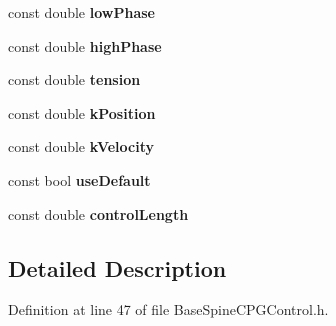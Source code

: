 \begin{DoxyCompactItemize}
\item 
\hypertarget{struct_base_spine_c_p_g_control_1_1_config_a334aedea7ddcc9e4c5156c81802df39f}{const double {\bfseries low\-Phase}}\label{struct_base_spine_c_p_g_control_1_1_config_a334aedea7ddcc9e4c5156c81802df39f}

\item 
\hypertarget{struct_base_spine_c_p_g_control_1_1_config_a3752344e31e424c346a9285f2d6f9f07}{const double {\bfseries high\-Phase}}\label{struct_base_spine_c_p_g_control_1_1_config_a3752344e31e424c346a9285f2d6f9f07}

\item 
\hypertarget{struct_base_spine_c_p_g_control_1_1_config_ac9d66433de98ee0d8fd05c0d96deb7ef}{const double {\bfseries tension}}\label{struct_base_spine_c_p_g_control_1_1_config_ac9d66433de98ee0d8fd05c0d96deb7ef}

\item 
\hypertarget{struct_base_spine_c_p_g_control_1_1_config_a5f11e2969a872b2771b3961af121f470}{const double {\bfseries k\-Position}}\label{struct_base_spine_c_p_g_control_1_1_config_a5f11e2969a872b2771b3961af121f470}

\item 
\hypertarget{struct_base_spine_c_p_g_control_1_1_config_a5f5968c82f22e82eb9e42de69f703cfb}{const double {\bfseries k\-Velocity}}\label{struct_base_spine_c_p_g_control_1_1_config_a5f5968c82f22e82eb9e42de69f703cfb}

\item 
\hypertarget{struct_base_spine_c_p_g_control_1_1_config_a1398892b6a2fec050598fea12d8bb9cc}{const bool {\bfseries use\-Default}}\label{struct_base_spine_c_p_g_control_1_1_config_a1398892b6a2fec050598fea12d8bb9cc}

\item 
\hypertarget{struct_base_spine_c_p_g_control_1_1_config_a391de1e5ad18fcffe2c41833e2454502}{const double {\bfseries control\-Length}}\label{struct_base_spine_c_p_g_control_1_1_config_a391de1e5ad18fcffe2c41833e2454502}

\end{DoxyCompactItemize}


\subsection{Detailed Description}


Definition at line 47 of file Base\-Spine\-C\-P\-G\-Control.\-h.




